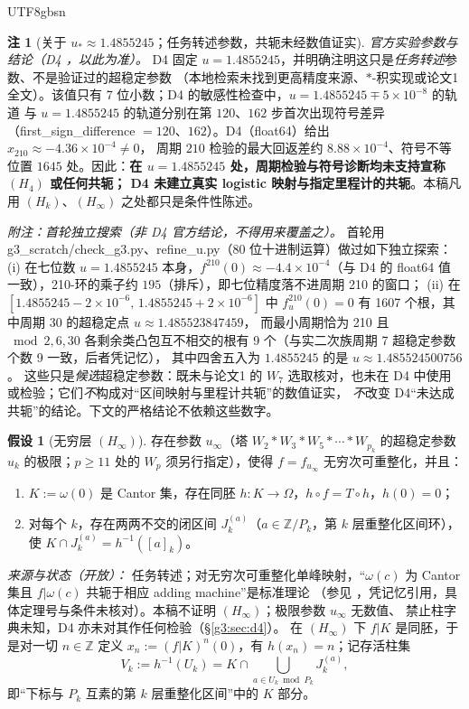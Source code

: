 \documentclass[11pt,a4paper]{article}
\newcommand{\Om}{\Omega}               %
\newcommand{\cyl}[2]{[#1]_{#2}}        %
\newcommand{\ust}{u_{*}}
\newcommand{\uinf}{u_{\infty}}
\theoremstyle{plain}
\theoremstyle{definition}
\newtheorem{hyp}[lem]{假设}
\newtheorem{rem}[lem]{注}
\begin{document}
\begin{CJK}{UTF8}{gbsn}
\begin{rem}[关于 $\ust\approx1.4855245$；任务转述参数，共轭未经数值证实]
\emph{官方实验参数与结论（D4 \cite{D4}，以此为准）。} D4 固定 $u=1.4855245$，并明确注明这只是\emph{任务转述}参数、不是验证过的超稳定参数
（本地检索未找到更高精度来源、$*$-积实现或论文1全文）。该值只有 7 位小数；D4 的敏感性检查中，$u=1.4855245\mp5\times10^{-8}$ 的轨道
与 $u=1.4855245$ 的轨道分别在第 $120$、$162$ 步首次出现符号差异（first\_sign\_difference $=120$、$162$）。D4（float64）给出 $x_{210}\approx-4.36\times10^{-4}\ne0$，
周期 $210$ 检验的最大回返差约 $8.88\times10^{-4}$、符号不等位置 $1645$ 处。因此：\textbf{在 $u=1.4855245$ 处，周期检验与符号诊断均未支持宣称 $(H_4)$ 或任何共轭；
D4 未建立真实 logistic 映射与指定里程计的共轭}。本稿凡用 $(H_k)$、$(H_\infty)$ 之处都只是条件性陈述。

\emph{附注：首轮独立搜索（非 D4 官方结论，不得用来覆盖之）。} 首轮用 g3\_scratch/check\_g3.py、refine\_u.py（80 位十进制运算）做过如下独立探索：
(i) 在七位数 $u=1.4855245$ 本身，$f^{210}(0)\approx-4.4\times10^{-4}$（与 D4 的 float64 值一致），210-环的乘子约 $195$（排斥），即七位精度落不进周期 210 的窗口；
(ii) 在 $[1.4855245-2\times10^{-6},\,1.4855245+2\times10^{-6}]$ 中 $f_u^{210}(0)=0$ 有 1607 个根，其中周期 30 的超稳定点 $u\approx1.485523847459$，
而最小周期恰为 210 且 $\bmod2,6,30$ 各剩余类凸包互不相交的根有 9 个（与实二次族周期 7 超稳定参数个数 9 一致，后者凭记忆），
其中四舍五入为 $1.4855245$ 的是 $u\approx1.485524500756$。
这些只是\emph{候选}超稳定参数：既未与论文1 的 $W_7$ 选取核对，也未在 D4 中使用或检验；它们\emph{不}构成对“区间映射与里程计共轭”的数值证实，
\emph{不}改变 D4“未达成共轭”的结论。下文的严格结论不依赖这些数字。
\end{rem}

\begin{hyp}[无穷层 $(H_\infty)$]\label{g3:hyp:infinite}
存在参数 $\uinf$（塔 $W_2*W_3*W_5*\cdots*W_{p_k}$ 的超稳定参数 $u_k$ 的极限；$p\ge11$ 处的 $W_p$ 须另行指定），使得 $f=f_{\uinf}$ 无穷次可重整化，并且：
\begin{enumerate}[label=(\roman*)]
\item $K:=\omega(0)$ 是 Cantor 集，存在同胚 $h:K\to\Om$，$h\circ f=T\circ h$，$h(0)=0$；
\item 对每个 $k$，存在两两不交的闭区间 $J_k^{(a)}$（$a\in\mathbb Z/P_k$，第 $k$ 层重整化区间环），使 $K\cap J_k^{(a)}=h^{-1}(\cyl ak)$。
\end{enumerate}
\end{hyp}
\emph{来源与状态（开放）：} 任务转述；对无穷次可重整化单峰映射，“$\omega(c)$ 为 Cantor 集且 $f|\omega(c)$ 共轭于相应 adding machine”是标准理论
（参见 \cite{dMvS93}，凭记忆引用，具体定理号与条件未核对）。本稿不证明 $(H_\infty)$；极限参数 $\uinf$ 无数值、
禁止柱字典未知，D4 亦未对其作任何检验（\S\ref{g3:sec:d4}）。
在 $(H_\infty)$ 下 $f|K$ 是同胚，于是对一切 $n\in\mathbb Z$ 定义 $x_n:=(f|K)^n(0)$，有 $h(x_n)=n$；记存活柱集
\[
V_k:=h^{-1}(U_k)=K\cap\bigcup_{a\in U_k\bmod P_k}J_k^{(a)},
\]
即“下标与 $P_k$ 互素的第 $k$ 层重整化区间”中的 $K$ 部分。


\end{CJK}
\end{document}
